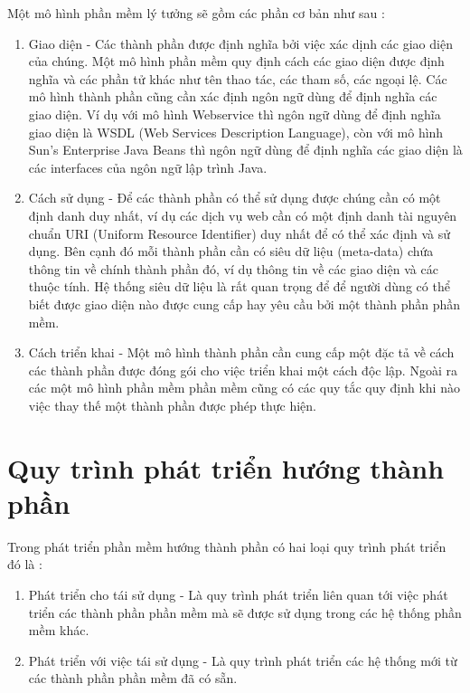 Một mô hình phần mềm lý tưởng sẽ gồm các phần cơ bản như sau :

\begin{enumerate}
  \item Giao diện - Các thành phần được định nghĩa bởi việc xác dịnh các giao diện của chúng. Một mô hình phần mềm quy định cách các giao diện được định nghĩa và các phần tử khác như tên thao tác, các tham số, các ngoại lệ. Các mô hình thành phần cũng cần xác định ngôn ngữ dùng để định nghĩa các giao diện. Ví dụ với mô hình Webservice thì ngôn ngữ dùng để định nghĩa giao diện là WSDL (Web Services Description Language), còn với mô hình Sun’s  Enterprise  Java  Beans thì ngôn ngữ dùng để định nghĩa các giao diện là các interfaces của ngôn ngữ lập trình Java.
	\item Cách sử dụng - Để các thành phần có thể sử dụng được chúng cần có một định danh duy nhất, ví dụ các dịch vụ web cần có một định danh tài nguyên chuẩn URI (Uniform Resource Identifier) duy nhất để có thể xác định và sử dụng. Bên cạnh đó mỗi thành phần cần có siêu dữ liệu (meta-data) chứa thông tin về chính thành phần đó, ví dụ thông tin về các giao diện và các thuộc tính. Hệ thống siêu dữ liệu là rất quan trọng để để người dùng có thể biết được giao diện nào được cung cấp hay yêu cầu bởi một thành phần phần mềm.
	\item Cách triển khai - Một mô hình thành phần cần cung cấp một đặc tả về cách các thành phần được đóng gói cho việc triển khai một cách độc lập. Ngoài ra các một mô hình phần mềm phần mềm cũng có các quy tắc quy định khi nào việc thay thế một thành phần được phép thực hiện. 
	
\end{enumerate}

\section{Quy trình phát triển hướng thành phần}
Trong phát triển phần mềm hướng thành phần có hai loại quy trình phát triển đó là :
\begin{enumerate}
\item Phát triển cho tái sử dụng - Là quy trình phát triển liên quan tới việc phát triển các thành phần phần mềm mà sẽ được sử dụng trong các hệ thống phần mềm khác.
\item Phát triển với việc tái sử dụng - Là quy trình phát triển các hệ thống mới từ các thành phần phần mềm đã có sẵn.
\end{enumerate}




